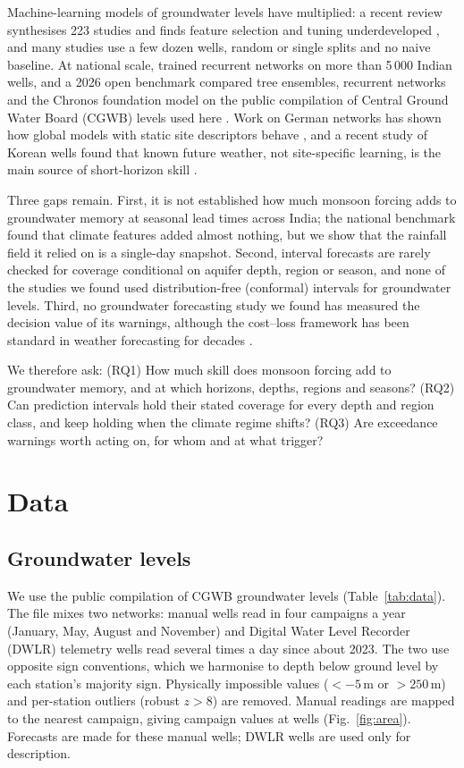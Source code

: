\documentclass[hess, manuscript]{copernicus}
\begin{document}
Machine-learning models of groundwater levels have multiplied: a recent review synthesises 223 studies and finds feature
selection and tuning underdeveloped \citep{jesse2025review}, and many studies use a few dozen wells, random or single
splits and no naive baseline. At national scale,
\citet{malakar2021india} trained recurrent networks on more than 5\,000 Indian wells, and a 2026 open benchmark compared
tree ensembles, recurrent networks and the Chronos foundation model on the public compilation of Central Ground Water Board
(CGWB) levels used here \citep{alphoenixx2026benchmark}. Work on German networks has shown how global models with static
site descriptors behave \citep{heudorfer2024global,gomez2024cnn,ohmer2026gems}, and a recent study of Korean wells found
that known future weather, not site-specific learning, is the main source of short-horizon skill \citep{kim2026sources}.

Three gaps remain. First, it is not established how much monsoon forcing adds to groundwater memory at seasonal lead times
across India; the national benchmark found that climate features added almost nothing, but we show that the rainfall field
it relied on is a single-day snapshot. Second, interval forecasts are rarely checked for coverage conditional on aquifer
depth, region or season, and none of the studies we found used distribution-free (conformal) intervals for groundwater
levels. Third, no groundwater forecasting study we found has measured the decision value of its warnings, although the
cost--loss framework has been standard in weather forecasting for decades \citep{richardson2000value}.

We therefore ask: (RQ1) How much skill does monsoon forcing add to groundwater memory, and at which horizons, depths,
regions and seasons? (RQ2) Can prediction intervals hold their stated coverage for every depth and region class, and keep
holding when the climate regime shifts? (RQ3) Are exceedance warnings worth acting on, for whom and at what trigger?

\section{Data}

\subsection{Groundwater levels}
We use the public compilation of CGWB groundwater levels \citep{alphoenixx2026benchmark} (Table~\ref{tab:data}). The file
mixes two networks: manual wells read in four campaigns a year (January, May, August and November) and Digital Water Level
Recorder (DWLR) telemetry wells read several times a day since about 2023. The two use opposite sign conventions, which we
harmonise to depth below ground level by each station's majority sign. Physically impossible values ($<-5$\,m or
$>250$\,m) and per-station outliers (robust $z>8$) are removed. Manual readings are mapped to the nearest campaign, giving
\nCampaigns{} campaign values at \nCampaignWells{} wells (Fig.~\ref{fig:area}). Forecasts are made for these manual wells;
DWLR wells are used only for description.
\end{document}
